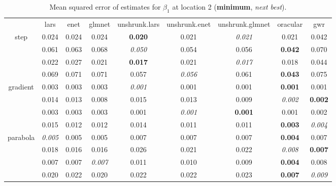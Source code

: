 \documentclass[authoryear, review, 11pt]{elsarticle}
\begin{document}
		\begin{table}[ht]
		\begin{center}
		\begin{tabular}{ccccccccc}
		  & lars & enet & glmnet & unshrunk.lars & unshrunk.enet & unshrunk.glmnet & oracular & gwr \\ 
		  \cline{2-9}
		  \multirow{4}{*}{step} & 0.024 & 0.024 & 0.024 & \textbf{0.020} & 0.021 & \emph{0.021} & 0.021 & 0.042 \\ 
		  & 0.061 & 0.063 & 0.068 & \emph{0.050} & 0.054 & 0.056 & \textbf{0.042} & 0.070 \\ 
		  & 0.022 & 0.027 & 0.021 & \textbf{0.017} & 0.021 & \emph{0.017} & 0.018 & 0.044 \\ 
		  & 0.069 & 0.071 & 0.071 & 0.057 & \emph{0.056} & 0.061 & \textbf{0.043} & 0.075 \\ 
		  \cline{2-9}
		  \multirow{4}{*}{gradient} & 0.003 & 0.003 & 0.003 & \emph{0.001} & 0.001 & 0.001 & \textbf{0.001} & 0.001 \\ 
		  & 0.014 & 0.013 & 0.008 & 0.015 & 0.013 & 0.009 & \emph{0.002} & \textbf{0.002} \\ 
		  & 0.003 & 0.003 & 0.003 & 0.001 & \emph{0.001} & \textbf{0.001} & 0.001 & 0.002 \\ 
		  & 0.015 & 0.012 & 0.012 & 0.014 & 0.011 & 0.011 & \textbf{0.003} & \emph{0.004} \\ 
		  \cline{2-9}
		  \multirow{4}{*}{parabola} & \emph{0.005} & 0.005 & 0.005 & 0.007 & 0.007 & 0.007 & \textbf{0.004} & 0.007 \\ 
		  & 0.018 & 0.016 & 0.016 & 0.026 & 0.021 & 0.022 & \emph{0.008} & \textbf{0.007} \\ 
		  & 0.007 & 0.007 & \emph{0.007} & 0.011 & 0.010 & 0.009 & \textbf{0.004} & 0.008 \\ 
		  & 0.020 & 0.022 & 0.020 & 0.022 & 0.022 & 0.023 & \textbf{0.007} & \emph{0.009} \\ 
		  \end{tabular}
		\caption{Mean squared error of estimates for $\beta_1$ at location 2 (\textbf{minimum}, \emph{next best}).\label{table:loc2-X1-MSEX}}
		\end{center}
		\end{table}
		
\end{document}
